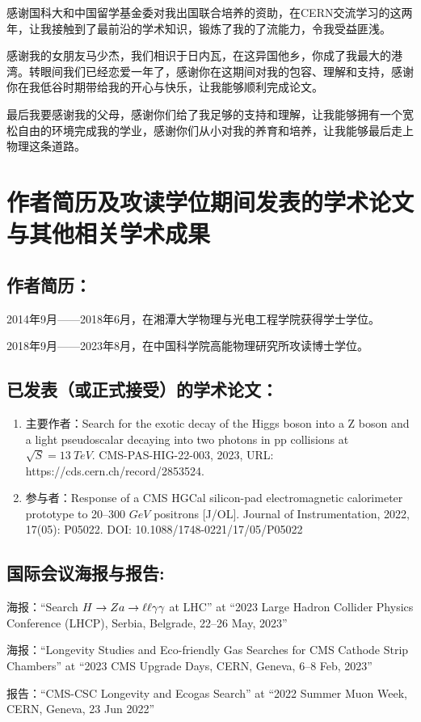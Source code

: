 感谢国科大和中国留学基金委对我出国联合培养的资助，在CERN交流学习的这两年，让我接触到了最前沿的学术知识，锻炼了我的了流能力，令我受益匪浅。

感谢我的女朋友马少杰，我们相识于日内瓦，在这异国他乡，你成了我最大的港湾。转眼间我们已经恋爱一年了，感谢你在这期间对我的包容、理解和支持，感谢你在我低谷时期带给我的开心与快乐，让我能够顺利完成论文。

最后我要感谢我的父母，感谢你们给了我足够的支持和理解，让我能够拥有一个宽松自由的环境完成我的学业，感谢你们从小对我的养育和培养，让我能够最后走上物理这条道路。


\chapter{作者简历及攻读学位期间发表的学术论文与其他相关学术成果}

\section*{作者简历：}
2014年9月——2018年6月，在湘潭大学物理与光电工程学院获得学士学位。

2018年9月——2023年8月，在中国科学院高能物理研究所攻读博士学位。


\section*{已发表（或正式接受）的学术论文：}

{
\setlist[enumerate]{}%
\begin{enumerate}[nosep]
    \item 主要作者：Search for the exotic decay of the Higgs boson into a Z boson and a light pseudoscalar decaying into two photons in pp collisions at $\sqrt{S} = 13~\si{TeV}$. CMS-PAS-HIG-22-003, 2023, URL: https://cds.cern.ch/record/2853524.
    \item 参与者：Response of a CMS HGCal silicon-pad electromagnetic calorimeter prototype to 20–300 $\si{GeV}$ positrons [J/OL]. Journal of Instrumentation, 2022, 17(05): P05022. DOI: 10.1088/1748-0221/17/05/P05022
\end{enumerate}
}

\section*{国际会议海报与报告:}

海报：“Search $H\to Za\to\ell\ell\gamma\gamma$ at LHC” at “2023 Large Hadron Collider Physics Conference (LHCP), Serbia, Belgrade, 22–26 May, 2023”

海报：“Longevity Studies and Eco-friendly Gas Searches for CMS Cathode Strip Chambers” at “2023 CMS Upgrade Days, CERN, Geneva, 6–8 Feb, 2023”

报告：“CMS-CSC Longevity and Ecogas Search” at “2022 Summer Muon Week, CERN, Geneva, 23 Jun 2022”


\cleardoublepage[plain]%
